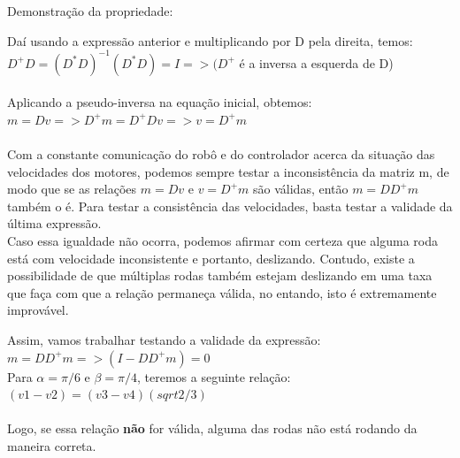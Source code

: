 \documentclass{article}
\begin{document}
Demonstração da propriedade:

Daí usando a expressão anterior e multiplicando por D pela direita, temos:
\\ $D^+D = (D^*D)^{-1}(D^*D) = I => (D^+$ é a inversa a esquerda de D)  
\\ \\ Aplicando a pseudo-inversa na equação inicial, obtemos:
$ m = Dv => D^+m = D^+Dv => v = D^+m$
\\ \\ Com a constante comunicação do robô e do controlador acerca da situação das velocidades dos motores, podemos sempre testar a inconsistência da matriz m, de modo que
se as relações $m = Dv$ e $v = D^+m$ são válidas, então $m = DD^+m$ também o é. Para testar a consistência das velocidades, basta testar a validade da última expressão.
\\ Caso essa igualdade não ocorra, podemos afirmar com certeza que alguma roda está com velocidade inconsistente e portanto, deslizando. Contudo, existe a possibilidade de que múltiplas rodas também estejam deslizando em uma taxa que faça com que a relação permaneça válida,
no entando, isto é extremamente improvável.

Assim, vamos trabalhar testando a validade da expressão:
\\ $ m = DD^+m => (I - DD^+m) = 0$
\\ Para $\alpha = \pi/6$ e $\beta = \pi/4$, teremos a seguinte relação:
\\ $(v1 - v2) = (v3 - v4)(sqrt{2/3})$
\\ \\ Logo, se essa relação \textbf{não} for válida, alguma das rodas não está rodando da maneira correta.
\end{document}
